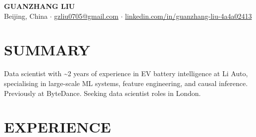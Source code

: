 \documentclass[a4paper,9pt]{article}
\begin{document}
\begin{center}
    {\Large\bfseries GUANZHANG LIU}\\[2pt]
    {\small
    Beijing, China
    \;$\cdot$\;
    \href{mailto:gzliu0705@gmail.com}{gzliu0705@gmail.com}
    \;$\cdot$\;
    \href{https://www.linkedin.com/in/guanzhang-liu-4a4a02413}{linkedin.com/in/guanzhang-liu-4a4a02413}
    }
\end{center}

\vspace{0pt}

\section{SUMMARY}
Data scientist with \textasciitilde2 years of experience in EV battery intelligence at Li Auto,
specialising in large-scale ML systems, feature engineering, and causal inference. Previously at ByteDance. Seeking data scientist roles in London.

\section{EXPERIENCE}
\end{document}
